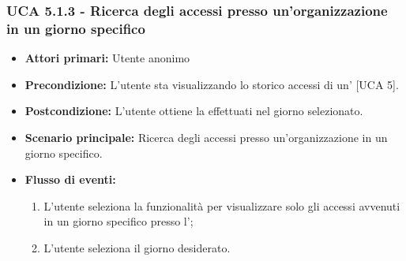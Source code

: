 \subsubsection{UCA 5.1.3 - Ricerca degli accessi presso un'organizzazione in un giorno specifico}
\begin{itemize}
	\item \textbf{Attori primari:} Utente anonimo
	\item \textbf{Precondizione:} L'utente sta visualizzando lo storico accessi di un' [UCA 5].
	\item \textbf{Postcondizione:} L'utente ottiene la  effettuati nel giorno selezionato.
	\item \textbf{Scenario principale:} Ricerca degli accessi presso un'organizzazione in un giorno specifico.
	\item \textbf{Flusso di eventi:}
	\begin{enumerate}
		\item L'utente seleziona la funzionalità per visualizzare solo gli accessi avvenuti in un giorno specifico presso l';
		\item L'utente seleziona il giorno desiderato.
	\end{enumerate}  
\end{itemize}

